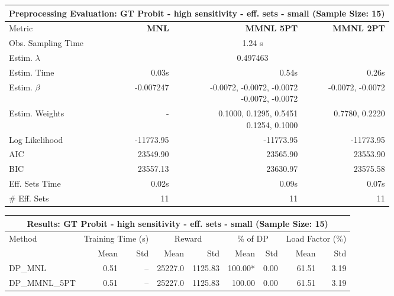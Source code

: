 
\begin{samepage}
\begin{center}
  \small
  \begin{tabular}{l|r|r|r}
    \toprule
    \multicolumn{4}{c}{\textbf{Preprocessing Evaluation: GT Probit - high sensitivity - eff. sets - small (Sample Size: 15)}} \\
    \midrule
    Metric & \textbf{MNL} & \textbf{MMNL 5PT} & \textbf{MMNL 2PT} \\
    \midrule
    Obs. Sampling Time & \multicolumn{3}{c}{1.24 s} \\
    Estim. $\lambda$ & \multicolumn{3}{c}{0.497463} \\
    Estim. Time & 0.03s & 0.54s & 0.26s \\
    Estim. $\beta$ & -0.007247 & \makecell[tr]{-0.0072, -0.0072, -0.0072 \\ -0.0072, -0.0072} & -0.0072, -0.0072 \\
    Estim. Weights & - & \makecell[tr]{0.1000, 0.1295, 0.5451 \\ 0.1254, 0.1000} & 0.7780, 0.2220 \\
    Log Likelihood & -11773.95 & -11773.95 & -11773.95 \\
    AIC & 23549.90 & 23565.90 & 23553.90 \\
    BIC & 23557.13 & 23630.97 & 23575.58 \\
    Eff. Sets Time & 0.02s & 0.09s & 0.07s \\
    \# Eff. Sets & 11 & 11 & 11 \\
    \bottomrule
  \end{tabular}
\end{center}
\begin{center}
  \small
  \begin{tabular}{l|rr|rr|rr|rr}
    \toprule
    \multicolumn{9}{c}{\textbf{Results: GT Probit - high sensitivity - eff. sets - small (Sample Size: 15)}} \\
    \midrule
    Method & \multicolumn{2}{c|}{Training Time (s)} & \multicolumn{2}{c|}{Reward} & \multicolumn{2}{c|}{\% of DP} & \multicolumn{2}{c}{Load Factor (\%)} \\
    & Mean & Std & Mean & Std & Mean & Std & Mean & Std \\
    \midrule
    DP\_MNL      &     0.51 &    -- &    25227.0 &    1125.83 & 100.00* &    0.00 &   61.51 &    3.19 \\
    DP\_MMNL\_5PT &     0.51 &    -- &    25227.0 &    1125.83 &  100.00 &    0.00 &   61.51 &    3.19 \\

\end{tabular}
\end{center}
\end{samepage}
